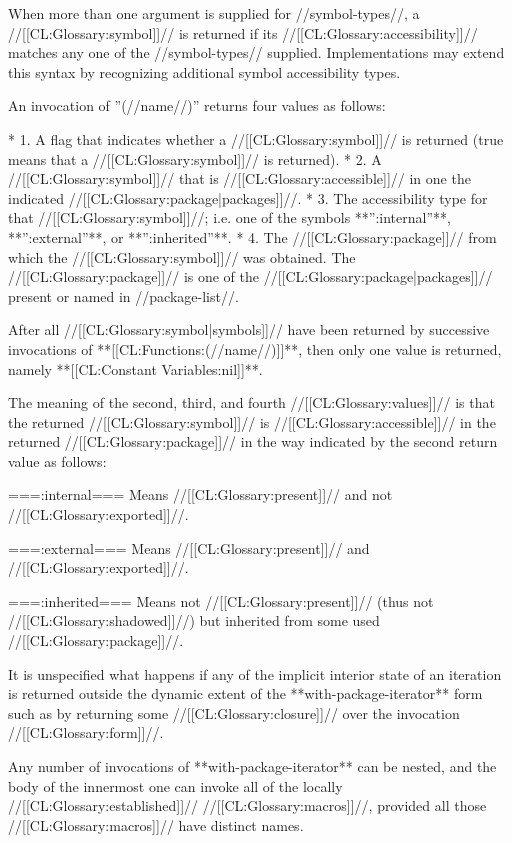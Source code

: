 When more than one argument is supplied for //symbol-types//, a //[[CL:Glossary:symbol]]// is returned if its //[[CL:Glossary:accessibility]]// matches any one of the //symbol-types// supplied. Implementations may extend this syntax by recognizing additional symbol accessibility types.

An invocation of ''(//name//)'' returns four values as follows:

  * 1. A flag that indicates whether a //[[CL:Glossary:symbol]]// is returned (true means that a //[[CL:Glossary:symbol]]// is returned). 
  * 2. A //[[CL:Glossary:symbol]]// that is //[[CL:Glossary:accessible]]// in one the indicated //[[CL:Glossary:package|packages]]//. 
  * 3. The accessibility type for that //[[CL:Glossary:symbol]]//; i.e. one of the symbols **'':internal''**, **'':external''**, or **'':inherited''**. 
  * 4. The //[[CL:Glossary:package]]// from which the //[[CL:Glossary:symbol]]// was obtained. The //[[CL:Glossary:package]]// is one of the //[[CL:Glossary:package|packages]]// present or named in //package-list//.

After all //[[CL:Glossary:symbol|symbols]]// have been returned by successive invocations of **[[CL:Functions:(//name//)]]**, then only one value is returned, namely **[[CL:Constant Variables:nil]]**.

The meaning of the second, third, and fourth //[[CL:Glossary:values]]// is that the returned //[[CL:Glossary:symbol]]// is //[[CL:Glossary:accessible]]// in the returned //[[CL:Glossary:package]]// in the way indicated by the second return value as follows:

===:internal===
Means //[[CL:Glossary:present]]// and not //[[CL:Glossary:exported]]//.

===:external===
Means //[[CL:Glossary:present]]// and //[[CL:Glossary:exported]]//.

===:inherited===
Means not //[[CL:Glossary:present]]// (thus not //[[CL:Glossary:shadowed]]//) but inherited from some used //[[CL:Glossary:package]]//.

It is unspecified what happens if any of the implicit interior state of an iteration is returned outside the dynamic extent of the **with-package-iterator** form such as by returning some //[[CL:Glossary:closure]]// over the invocation //[[CL:Glossary:form]]//.

Any number of invocations of **with-package-iterator** can be nested, and the body of the innermost one can invoke all of the locally //[[CL:Glossary:established]]// //[[CL:Glossary:macros]]//, provided all those //[[CL:Glossary:macros]]// have distinct names.


